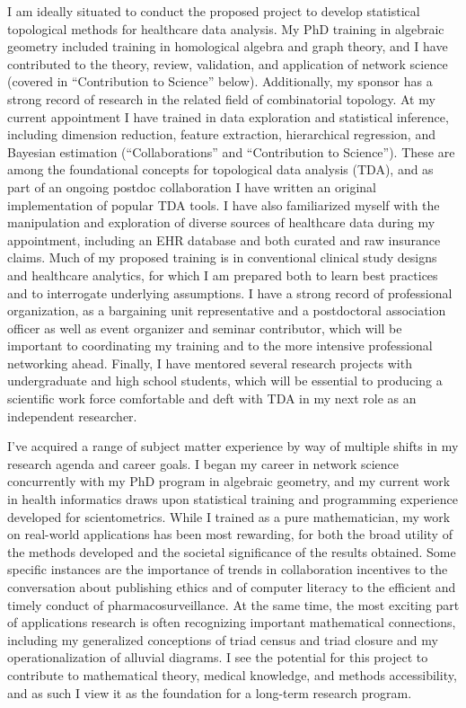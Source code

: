 \documentclass{nihbiosketch}
\begin{document}
\begin{statement}

I am ideally situated to conduct the proposed project to develop statistical topological methods for healthcare data analysis.
My PhD training in algebraic geometry included training in homological algebra and graph theory, and I have contributed to the theory, review, validation, and application of network science (covered in ``Contribution to Science'' below). Additionally, my sponsor has a strong record of research in the related field of combinatorial topology.
At my current appointment I have trained in data exploration and statistical inference, including dimension reduction, feature extraction, hierarchical regression, and Bayesian estimation (``Collaborations'' and ``Contribution to Science''). These are among the foundational concepts for topological data analysis (TDA), and as part of an ongoing postdoc collaboration I have written an original implementation of popular TDA tools.
I have also familiarized myself with the manipulation and exploration of diverse sources of healthcare data during my appointment, including an EHR database and both curated and raw insurance claims. Much of my proposed training is in conventional clinical study designs and healthcare analytics, for which I am prepared both to learn best practices and to interrogate underlying assumptions.
I have a strong record of professional organization, as a bargaining unit representative and a postdoctoral association officer as well as event organizer and seminar contributor, which will be important to coordinating my training and to the more intensive professional networking ahead.
Finally, I have mentored several research projects with undergraduate and high school students, which will be essential to producing a scientific work force comfortable and deft with TDA in my next role as an independent researcher.

I've acquired a range of subject matter experience by way of multiple shifts in my research agenda and career goals. I began my career in network science concurrently with my PhD program in algebraic geometry, and my current work in health informatics draws upon statistical training and programming experience developed for scientometrics.
While I trained as a pure mathematician, my work on real-world applications has been most rewarding, for both the broad utility of the methods developed and the societal significance of the results obtained. Some specific instances are the importance of trends in collaboration incentives to the conversation about publishing ethics and of computer literacy to the efficient and timely conduct of pharmacosurveillance. At the same time, the most exciting part of applications research is often recognizing important mathematical connections, including my generalized conceptions of triad census and triad closure and my operationalization of alluvial diagrams. I see the potential for this project to contribute to mathematical theory, medical knowledge, and methods accessibility, and as such I view it as the foundation for a long-term research program.


\end{statement}
\end{document}

